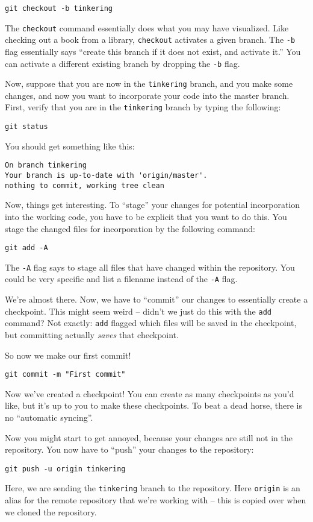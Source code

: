 \documentclass[11pt, oneside]{article}   	%
\begin{document}
\begin{lstlisting}
git checkout -b tinkering
\end{lstlisting}

The \texttt{checkout} command essentially does what you may have visualized. Like checking out a book from a library, \texttt{checkout} activates a given branch. The \texttt{-b} flag essentially says ``create this branch if it does not exist, and activate it.'' You can activate a different existing branch by dropping the \texttt{-b} flag.

Now, suppose that you are now in the \texttt{tinkering} branch, and you make some changes, and now you want to incorporate your code into the master branch. First, verify that you are in the \texttt{tinkering} branch by typing the following:

\begin{lstlisting}
git status
\end{lstlisting}
You should get something like this:
\begin{lstlisting}
On branch tinkering
Your branch is up-to-date with 'origin/master'.
nothing to commit, working tree clean
\end{lstlisting}

Now, things get interesting. To ``stage'' your changes for potential incorporation into the working code, you have to be explicit that you want to do this. You stage the changed files for incorporation by the following command:
\begin{lstlisting}
git add -A
\end{lstlisting}

The \texttt{-A} flag says to stage all files that have changed within the repository. You could be very specific and list a filename instead of the \texttt{-A} flag.

We're almost there. Now, we have to ``commit'' our changes to essentially create a checkpoint. This might seem weird -- didn't we just do this with the \texttt{add} command? Not exactly: \texttt{add} flagged which files will be saved in the checkpoint, but committing actually \textit{saves} that checkpoint.

So now we make our first commit!
\begin{lstlisting}
git commit -m "First commit"
\end{lstlisting}
Now we've created a checkpoint! You can create as many checkpoints as you'd like, but it's up to you to make these checkpoints. To beat a dead horse, there is no ``automatic syncing''.

Now you might start to get annoyed, because your changes are still not in the repository. You now have to ``push'' your changes to the repository:

\begin{lstlisting} 
git push -u origin tinkering
\end{lstlisting}
Here, we are sending the \texttt{tinkering} branch to the repository. Here \texttt{origin} is an alias for the remote repository that we're working with -- this is copied over when we cloned the repository.
\end{document}
